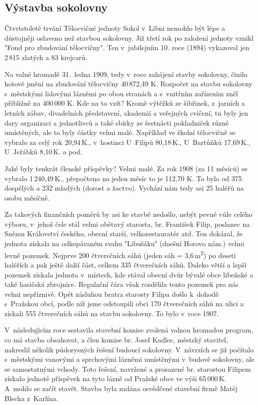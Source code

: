 \documentclass[a5paper, 11pt, twoside]{article}
\begin{document}
\subsection{Výstavba sokolovny}

Čtvrtstoleté trvání Tělocvičné jednoty Sokol v~Libni nemohlo být lépe a
důstojněji oslaveno než stavbou sokolovny. Již třetí rok po založení
jednoty vznikl "Fond pro zbudování tělocvičny". Ten v~jubilejním 10.
roce (1894) vykazoval jen 2\,815 zlatých a 83 krejcarů.

Na valné hromadě 31.~ledna 1909, tedy v~roce zahájení stavby sokolovny,
činilo hotové jmění na zbudování tělocvičny 40\,872,49 K. Rozpočet na
stavbu sokolovny s~městskými lidovými lázněmi po obou stranách a
s~vnitřním zařízením zněl přibližně na 400\,000 K. Kde na to vzít? Kromě
výtěžků ze šibřinek, z~jarních a letních zábav, divadelních představení,
akademií a veřejných cvičení, tu byly jen dary organizaci a jednotlivců
a také sbírky ze šestnácti pokladniček různě umístěných, ale to byly
částky velmi malé. Například ve školní tělocvičně se vybralo za celý rok
20,94\,K., v~hostinci U~Filipů 80,18\,K., U~Bartůňků 17,69\,K., U~Jeřábků
8,10\,K. a pod.

Jaké byly tenkrát členské příspěvky? Velmi malé. Za rok 1908 (za 11
měsíců) se vybralo 1\,240,49\,K., přepočteno na jeden měsíc to je 112,70
K. To bylo od 375 dospělých a 232 mladých (dorost a žactvo). Vychází nám
tedy asi 25 haléřů na osobu měsíčně.

Za takových finančních poměrů by asi ke stavbě nedošlo, nebýt pevné vůle
celého výboru, v~jehož čele stál velmi obětavý starosta, br. František
Filip, poslanec na Sněmu Království českého, obecní starší,
velkorestauratér atd. Ten dokázal, že jednota získala na odkopávaném
svahu "Libušáku" (dnešní Horovo nám.) velmi levně pozemek. Nejprve 200
čtverečních sáhů (jeden sáh = 3,6\,m\textsuperscript{2}) po deseti
haléřích a pak ještě další část, celkem 335 čtverečních sáhů. Daleko
větší a lepší pozemek získala jednota v~místech, kde stával obecní dvůr
bývalé obce libeňské a také hasičská zbrojnice. Regulační čára však
rozdělila tento pozemek pro nás velmi nepříznivě. Opět zásluhou bratra
starosty Filipa došlo k~dohodě s~Pražskou obcí, podle níž jsme
odstoupili obci 170 čtverečních sáhů na ulici a získali 555 čtverečních
sáhů na stavbu sokolovny. To bylo v~roce 1907.

V~následujícím roce sestavila stavební komise zvolená valnou hromadou
program, co má stavba obsahovat, a člen komise br. Josef Kadlec, městský
stavitel, nakreslil několik půdorysných řešení budoucí sokolovny.
V~návrzích se již počítalo s~městskými vanovými a sprchovými lázněmi
umístěnými v~budově sokolovny, ale se samostatnými vchody. Toto řešení,
navržené a prosazené br. starostou Filipem získalo jednotě příspěvek na
tyto lázně od Pražské obce ve výši 65\,000\,K. A~mohlo se začít stavět.
Stavba byla zadána osvědčené stavební firmě Matěj Blecha z~Karlína.
\end{document}
